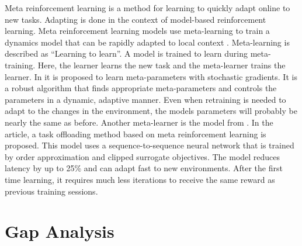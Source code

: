 Meta reinforcement learning is a method for learning to quickly adapt online
to new tasks. Adapting is done in the context of model-based reinforcement
learning. Meta reinforcement learning models use meta-learning to train a
dynamics model that can be rapidly adapted to local context
\cite{nagabandi2019}. Meta-learning is described as ``Learning to learn''. A
model is trained to learn during meta-training. Here, the learner learns the new
task and the meta-learner trains the learner. In \cite{schweighofer2003} it is
proposed to learn meta-parameters with stochastic gradients. It is a robust
algorithm that finds appropriate meta-parameters and controls the parameters
in a dynamic, adaptive manner. Even when retraining is needed to adapt to the
changes in the environment, the models parameters will probably be nearly the
same as before. Another meta-learner is the \mrlco model from
. In the article, a task offloading method based on meta
reinforcement learning is proposed. This model uses a sequence-to-sequence
neural network that is trained by order approximation and clipped surrogate
objectives. The model reduces latency by up to 25\% and can adapt fast
to new environments. After the first time learning, it requires much less
iterations to receive the same reward as previous training sessions.


\section{Gap Analysis}\label{sec:gap}

